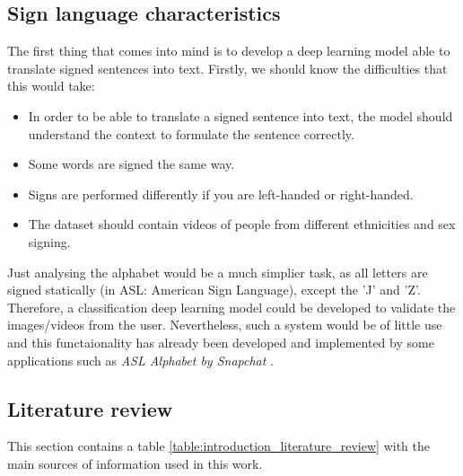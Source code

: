 \subsection{Sign language characteristics}
The first thing that comes into mind is to develop a deep learning model able to translate signed sentences into 
text. Firstly, we should know the difficulties that this would take:
\begin{itemize}[noitemsep]
    \item In order to be able to translate a signed sentence into text, the model should understand the context to formulate the sentence correctly.
    \item Some words are signed the same way.
    \item Signs are performed differently if you are left-handed or right-handed.
    \item The dataset should contain videos of people from different ethnicities and sex signing.
\end{itemize}

Just analysing the alphabet would be a much simplier task, as all letters are signed statically (in ASL: American Sign Language), except the 'J' and 'Z'.
Therefore, a classification deep learning model could be developed to validate the images/videos from the user.
Nevertheless, such a system would be of little use and this functaionality has already been developed and implemented by some applications such as \textit{ASL Alphabet by Snapchat} \cite{Snapchat}.

\subsection{Literature review}
\label{LiteratureReview}
This section contains a table \ref{table:introduction_literature_review} with the main sources of information used in this work. \\

